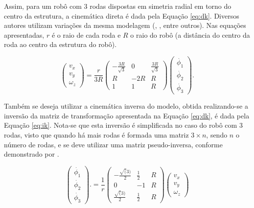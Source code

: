 Assim, para um robô com 3 rodas dispostas em simetria radial em torno do centro da estrutura, a cinemática direta é dada pela Equação \ref{eq:dk}. Diversos autores utilizam variações da mesma modelagem (\cite{rojas2006holonomic}, \cite{pin1994new}, entre outros). Nas equações apresentadas, $r$ é o raio de cada roda e $R$ o raio do robô (a distância do centro da roda ao centro da estrutura do robô).

\begin{equation}
  \begin{pmatrix}
    v_x \\
    v_y \\
    \omega_z
  \end{pmatrix}
  =
  \frac{r}{3R}
  \begin{pmatrix}
    -\frac{3R}{\sqrt{3}} & 0   & \frac{3R}{\sqrt{3}} \\
    R                    & -2R & R                   \\
    1                    & 1   & R
  \end{pmatrix}
  \begin{pmatrix}
    \dot{\phi_1} \\
    \dot{\phi_2} \\
    \dot{\phi_3}
  \end{pmatrix}.
  \label{eq:dk}
\end{equation}

Também se deseja utilizar a cinemática inversa do modelo, obtida realizando-se a inversão da matriz de transformação apresentada na Equação \ref{eq:dk}, é dada pela Equação \ref{eq:ik}. Nota-se que esta inversão é simplificada no caso do robô com 3 rodas, visto que quando há mais rodas é formada uma matriz $3 \times n$, sendo $n$ o número de rodas, e se deve utilizar uma matriz pseudo-inversa, conforme demonstrado por \cite{rojas2006holonomic}.

\begin{equation}
  \begin{pmatrix}
    \dot{\phi_1} \\
    \dot{\phi_2} \\
    \dot{\phi_3}
  \end{pmatrix}.
  =
  \frac{1}{r}
  \begin{pmatrix}
    -\frac{\sqrt(3)}{2} & \frac{1}{2} & R \\
    0                   & -1          & R \\
    \frac{\sqrt(3)}{2}  & \frac{1}{2} & R
  \end{pmatrix}
  \begin{pmatrix}
    v_x \\
    v_y \\
    \omega_z
  \end{pmatrix}
  \label{eq:ik}
\end{equation}

